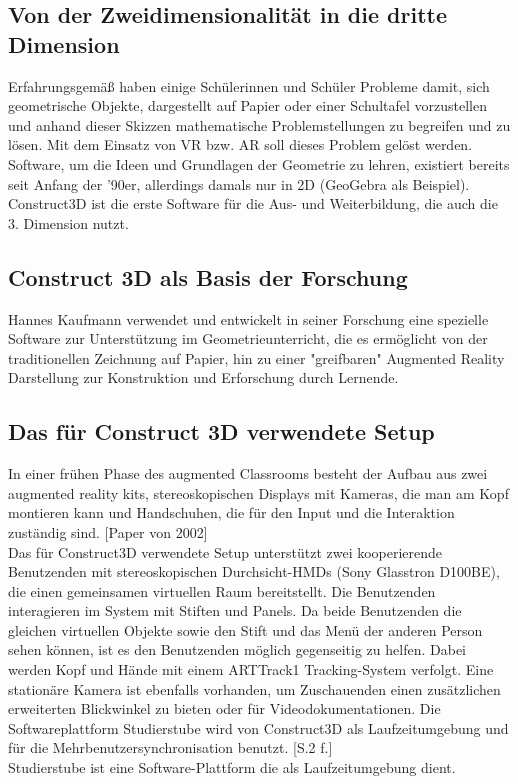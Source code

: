 \documentclass[deutsch]{llncs}
\begin{document}
\subsection{Von der Zweidimensionalität in die dritte Dimension}
\label{subsec:}
Erfahrungsgemäß haben einige Schülerinnen und Schüler Probleme damit, sich geometrische Objekte, dargestellt auf Papier oder einer Schultafel vorzustellen und anhand dieser Skizzen mathematische Problemstellungen zu begreifen und zu lösen. Mit dem Einsatz von VR bzw. AR soll dieses Problem gelöst werden.\\
Software, um die Ideen und Grundlagen der Geometrie zu lehren, existiert bereits seit Anfang der '90er, allerdings damals nur in 2D (GeoGebra als Beispiel). \\
Construct3D ist die erste Software für die Aus- und Weiterbildung, die auch die 3. Dimension nutzt. \cite{4}


\subsection{Construct 3D als Basis der Forschung}
\label{subsec:}
Hannes Kaufmann verwendet und entwickelt in seiner Forschung eine spezielle Software zur Unterstützung im Geometrieunterricht, die es ermöglicht von der traditionellen Zeichnung auf Papier,
hin zu einer "greifbaren" Augmented Reality Darstellung zur Konstruktion und Erforschung durch Lernende. 

\subsection{Das für Construct 3D verwendete Setup}
\label{subsec:}
In einer frühen Phase des augmented Classrooms besteht der Aufbau aus zwei augmented reality kits, stereoskopischen Displays mit Kameras, die man am Kopf montieren kann und Handschuhen, die für den Input und die Interaktion zuständig sind. [Paper von 2002]
\noindent \\
Das für Construct3D verwendete Setup unterstützt zwei kooperierende Benutzenden mit stereoskopischen Durchsicht-HMDs 
(Sony Glasstron D100BE), die einen gemeinsamen virtuellen Raum bereitstellt. Die Benutzenden interagieren im System mit Stiften und Panels. 
Da beide Benutzenden die gleichen virtuellen Objekte sowie den Stift und das Menü der anderen Person sehen können, ist es den Benutzenden möglich 
gegenseitig zu helfen. Dabei werden Kopf und Hände mit einem ARTTrack1 Tracking-System verfolgt. Eine stationäre Kamera ist ebenfalls vorhanden, um Zuschauenden
einen zusätzlichen erweiterten Blickwinkel zu bieten oder für Videodokumentationen. Die Softwareplattform Studierstube wird von Construct3D als 
Laufzeitumgebung und für die Mehrbenutzersynchronisation benutzt. [S.2 f.]\\
Studierstube ist eine Software-Plattform die als Laufzeitumgebung dient. 
\end{document}
